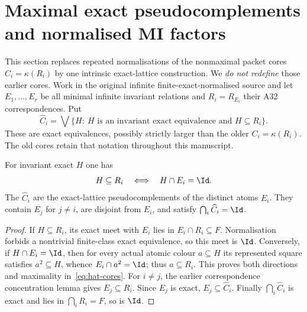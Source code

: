 \section{Maximal exact pseudocomplements and normalised MI factors}
\label{sec:acf-maximal-cores}

This section replaces repeated normalisations of the nonmaximal
packet cores $C_i=\kappa(R_i)$ by one intrinsic exact-lattice
construction.  We \emph{do not redefine} those earlier cores.
Work in the original infinite finite-exact-normalised source
and let $E_1,\ldots,E_r$ be all minimal infinite invariant
relations and $R_i=R_{E_i}$ their A32 correspondences.
Put
\begin{equation}\label{eq:hat-cores}
 \widehat C_i=\bigvee\{H:\ H\text{ is an invariant exact
 equivalence and }H\subseteq R_i\}.
\end{equation}
These are exact equivalences, possibly strictly larger
than the older $C_i=\kappa(R_i)$.  The old cores retain
that notation throughout this manuscript.

\begin{lemma}
\label{lem:acf-hat-pseudocomplement}
For invariant exact $H$ one has
\[
         H\subseteq R_i
       \quad\Longleftrightarrow\quad H\cap E_i=\Id.
\]
The $\widehat C_i$ are the exact-lattice pseudocomplements of
the distinct atoms $E_i$.  They contain $E_j$ for $j\ne i$,
are disjoint from $E_i$, and satisfy $\bigcap_i\widehat C_i=\Id$.
\end{lemma}
\begin{proof}
If $H\subseteq R_i$, its exact meet with $E_i$ lies in
$E_i\cap R_i\subseteq F$.  Normalisation forbids a nontrivial
finite-class exact equivalence, so this meet is $\Id$.
Conversely, if $H\cap E_i=\Id$, then for every actual
atomic colour $a\subseteq H$ its represented square satisfies
$a^2\subseteq H$, whence $E_i\cap a^2=\Id$; thus $a\subseteq R_i$.
This proves both directions and maximality in~\eqref{eq:hat-cores}.
For $i\ne j$, the earlier correspondence concentration
lemma gives $E_j\subseteq R_i$.  Since $E_j$ is exact,
$E_j\subseteq\widehat C_i$.  Finally $\bigcap_i\widehat C_i$
is exact and lies in $\bigcap_iR_i=F$, so is $\Id$.
\end{proof}

